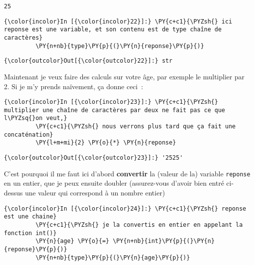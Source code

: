     \begin{Verbatim}[commandchars=\\\{\}]
25

    \end{Verbatim}

    \begin{Verbatim}[commandchars=\\\{\}]
{\color{incolor}In [{\color{incolor}22}]:} \PY{c+c1}{\PYZsh{} ici reponse est une variable, et son contenu est de type chaîne de caractères}
         \PY{n+nb}{type}\PY{p}{(}\PY{n}{reponse}\PY{p}{)}
\end{Verbatim}


\begin{Verbatim}[commandchars=\\\{\}]
{\color{outcolor}Out[{\color{outcolor}22}]:} str
\end{Verbatim}
            
    Maintenant je veux faire des calculs sur votre âge, par exemple le
multiplier par 2. Si je m'y prends naïvement, ça donne ceci~:

    \begin{Verbatim}[commandchars=\\\{\}]
{\color{incolor}In [{\color{incolor}23}]:} \PY{c+c1}{\PYZsh{} multiplier une chaîne de caractères par deux ne fait pas ce que l\PYZsq{}on veut,}
         \PY{c+c1}{\PYZsh{} nous verrons plus tard que ça fait une concaténation}
         \PY{l+m+mi}{2} \PY{o}{*} \PY{n}{reponse}
\end{Verbatim}


\begin{Verbatim}[commandchars=\\\{\}]
{\color{outcolor}Out[{\color{outcolor}23}]:} '2525'
\end{Verbatim}
            
    C'est pourquoi il me faut ici d'abord \textbf{convertir} la (valeur de
la) variable \texttt{reponse} en un entier, que je peux ensuite doubler
(assurez-vous d'avoir bien entré ci-dessus une valeur qui correspond à
un nombre entier)

    \begin{Verbatim}[commandchars=\\\{\}]
{\color{incolor}In [{\color{incolor}24}]:} \PY{c+c1}{\PYZsh{} reponse est une chaine}
         \PY{c+c1}{\PYZsh{} je la convertis en entier en appelant la fonction int()}
         \PY{n}{age} \PY{o}{=} \PY{n+nb}{int}\PY{p}{(}\PY{n}{reponse}\PY{p}{)}
         \PY{n+nb}{type}\PY{p}{(}\PY{n}{age}\PY{p}{)}
\end{Verbatim}


